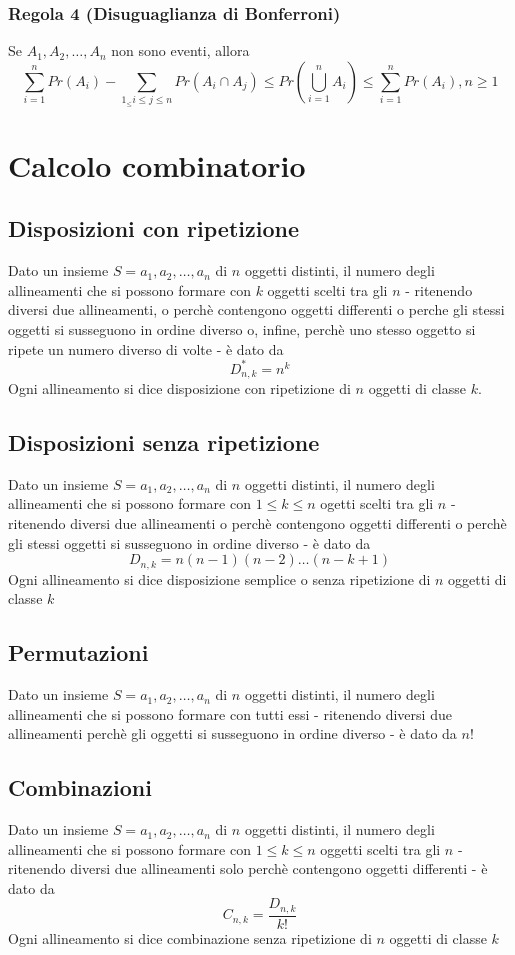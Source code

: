 \documentclass[a4paper]{report}
\begin{document}
  \subsection{Regola 4 (Disuguaglianza di Bonferroni)}
  Se $A_1, A_2, \dots, A_n$ non sono eventi, allora
  \[ \sum_{i=1}^{n} Pr(A_i) - \sum_{1_\leqslant i \leqslant j \leqslant n} Pr(A_i \cap A_j) \leqslant Pr(\bigcup\limits_{i=1}^{n} A_i) \leqslant \sum_{i=1}^{n} Pr(A_i),     n \geq 1 \]

  \chapter{Calcolo combinatorio}
  \section{Disposizioni con ripetizione}
  Dato un insieme $S = {a_1,a_2,\dots,a_n}$ di $n$ oggetti distinti, il numero degli allineamenti che si possono formare con $k$ oggetti scelti tra gli $n$ - ritenendo diversi due allineamenti, o perchè contengono oggetti differenti o perche gli stessi oggetti si susseguono in ordine diverso o, infine, perchè uno stesso oggetto si ripete un numero diverso di volte - è dato da
  \[ D_{n,k}^* = n^k \]
  Ogni allineamento si dice disposizione con ripetizione di $n$ oggetti di classe $k$.

  \section{Disposizioni senza ripetizione}
  Dato un insieme $S={a_1,a_2,\dots,a_n}$ di $n$ oggetti distinti, il numero degli allineamenti che si possono formare con $1 \leqslant k \leqslant n$ ogetti scelti tra gli $n$ - ritenendo diversi due allineamenti o perchè contengono oggetti differenti o perchè gli stessi oggetti si susseguono in ordine diverso - è dato da
  \[ D_{n,k} = n(n-1)(n-2)\dots(n-k + 1) \]
  Ogni allineamento si dice disposizione semplice o senza ripetizione di $n$ oggetti di classe $k$

  \section{Permutazioni}
  Dato un insieme $S={a_1,a_2,\dots,a_n}$ di $n$ oggetti distinti, il numero degli allineamenti che si possono formare con tutti essi - ritenendo diversi due allineamenti perchè gli oggetti si susseguono in ordine diverso - è dato da $n!$

  \section{Combinazioni}
  Dato un insieme $S={a_1,a_2,\dots,a_n}$ di $n$ oggetti distinti, il numero degli allineamenti che si possono formare con $1 \leqslant k \leqslant n$ oggetti scelti tra gli $n$ - ritenendo diversi due allineamenti solo perchè contengono oggetti differenti - è dato da
  \[ C_{n,k} = \frac{D_{n,k}}{k!} \]
  Ogni allineamento si dice combinazione senza ripetizione di $n$ oggetti di classe $k$
\end{document}
